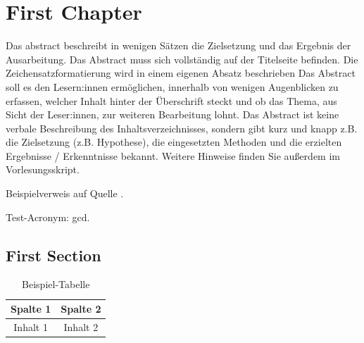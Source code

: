 

\chapter{First Chapter}

Das \gls{abstract} beschreibt in wenigen Sätzen die Zielsetzung und das Ergebnis der Ausarbeitung. Das Abstract muss sich vollständig auf der Titelseite befinden. Die Zeichensatzformatierung wird in einem eigenen Absatz beschrieben  Das Abstract soll es den Lesern:innen ermöglichen, innerhalb von wenigen Augenblicken zu erfassen, welcher Inhalt hinter der Überschrift steckt und ob das Thema, aus Sicht der Leser:innen, zur weiteren Bearbeitung lohnt. Das Abstract ist keine verbale Beschreibung des Inhaltsverzeichnisses, sondern gibt kurz und knapp z.B. die Zielsetzung (z.B. Hypothese), die eingesetzten Methoden und die erzielten Ergebnisse / Erkenntnisse bekannt. Weitere Hinweise finden Sie außerdem im Vorlesungsskript.

Beispielverweis auf Quelle \cite{ahrensAbschlussarbeiten}.

Test-Acronym: \acrshort{gcd}.

\section{First Section}

\begin{table}[h]
\centering
\begin{tabular}{|c|c|}
\hline
Spalte 1 & Spalte 2 \\
\hline
Inhalt 1 & Inhalt 2 \\
\hline
\end{tabular}
\caption{Beispiel-Tabelle}
\label{tab:example}
\end{table}

